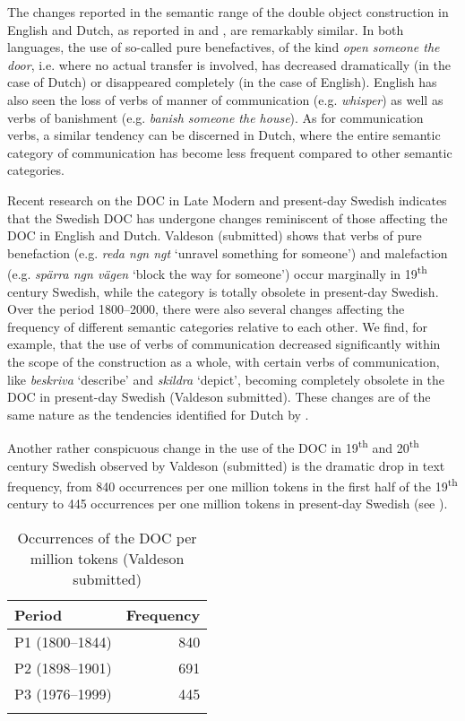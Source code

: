 \documentclass[output=paper]{langscibook}
\begin{document}
The changes reported in the semantic range of the double object construction in English and Dutch, as reported in  \citet{CollemanDe_Clerck2011} and \citet{Colleman2011}, are remarkably similar. In both languages, the use of so-called pure benefactives, of the kind \textit{open someone the door}, i.e. where no actual transfer is involved, has decreased dramatically (in the case of Dutch) or disappeared completely (in the case of English). English has also seen the loss of verbs of manner of communication (e.g. \textit{whisper}) as well as verbs of banishment (e.g. \textit{banish someone the house}). As for communication verbs, a similar tendency can be discerned in Dutch, where the entire semantic category of communication has become less frequent compared to other semantic categories.



Recent research on the DOC in Late Modern and present-day Swedish indicates that the Swedish DOC has undergone changes reminiscent of those affecting the DOC in English and Dutch. Valdeson (submitted) shows that verbs of pure benefaction (e.g. \textit{reda ngn ngt} ‘unravel something for someone’) and malefaction (e.g. \textit{spärra ngn vägen} ‘block the way for someone’) occur marginally in 19\textsuperscript{th} century Swedish, while the category is totally obsolete in present-day Swedish. Over the period 1800–2000, there were also several changes affecting the frequency of different semantic categories relative to each other. We find, for example, that the use of verbs of communication decreased significantly within the scope of the construction as a whole, with certain verbs of communication, like \textit{beskriva} ‘describe’ and \textit{skildra} ‘depict’, becoming completely obsolete in the DOC in present-day Swedish (Valdeson submitted). These changes are of the same nature as the tendencies identified for Dutch by \citet{Colleman2011}.



Another rather conspicuous change in the use of the DOC in 19\textsuperscript{th} and 20\textsuperscript{th} century Swedish observed by Valdeson (submitted) is the dramatic drop in text frequency, from 840 occurrences per one million tokens in the first half of the 19\textsuperscript{th} century to 445 occurrences per one million tokens in present-day Swedish (see ).


\begin{table}
\caption{Occurrences of the DOC per million tokens (Valdeson submitted)\label{tab:valdeson:1}}
\begin{tabular}{lr}
\lsptoprule
Period & Frequency\\
\midrule
P1 (1800–1844) & 840\\
P2 (1898–1901) & 691\\
P3 (1976–1999) & 445\\
\lspbottomrule
\end{tabular}
\end{table}
\end{document}
